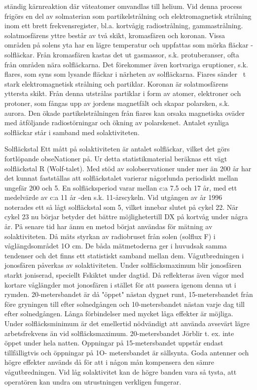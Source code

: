 \documentclass[a4paper,twoside,twocolumn,openright]{book}
\begin{document}
{{{{{ständig kärnreaktion där väteatomer omvandlas till helium. Vid denna process frigörs en del av solmaterian som partikelstrålning och elektromagnetisk strålning inom ett
brett frekvensregister, bl.a. kortvågig radiostrålning, gammastrålning. solatmosfärens
yttre består av två skikt, kromasfären och
koronan. Vissa områden på solens yta har
en lägre temperatur och uppfattas som mörka fläckar - solfläckar. Från kromasfären
kastas det ut gasmassor, s.k. protuberanser, ofta från områden nära solfläckarna.
Det förekommer även kortvariga eruptioner, s.k. flares, som syns som lysande fläckar i närheten av solfläckarna. Fiares sänder
~t stark elektromagnetisk strålning och partiklar. Koronan är solatmosfärens yttersta
skikt. Från denna utstrålas partiklar i form av
atomer, elektroner och protoner, som fångas upp av jordens magnetfält och skapar
polarsken, s.k. aurora. Den ökade partikelstrålningen från fiares kan orsaka magnetiska oväder med åtföljande radiostörningar
och ökning av polarskenet. Antalet synliga
solfläckar står i samband med solaktiviteten.

Solfläckstal
Ett mått på solaktiviteten är antalet solfläckar, vilket det görs fortlöpande obseNationer på. Ur detta statistikmaterial beräknas
ett vägt solfläckstal R (Wolf-talet). Med stöd
av solobservationer under mer än 200 år har
det kunnat fastställas att solfläckstalet varierar någorlunda periodiskt mellan ungefär
200 och 5.
En solfläcksperiod varar mellan c:a 7.5
och 17 år, med ett medelvärde av c:a 11 år
-den s.k. 11-årscykeln. Vid utgången av år
1996 noterades ett så lågt solfläckstal som
5, vilket innebar slutet på cykel 22.
När cykel 23 nu börjar betyder det bättre
möjlighetertill DX på kortvåg under några år.
På senare tid har ännu en metod börjat
användas för mätning av solaktiviteten. Då
mäts styrkan av radiobruset från solen (solflux F) i våglängdsområdet 1O cm.
De båda mätmetoderna ger i huvudsak
samma tendenser och det finns ett statistiskt
samband mellan dem.
Vågutbredningen i jonosfären påverkas
av solaktiviteten. Under solfläcksmaximum
blir jonosfären starkt joniserad, speciellt Fskiktet under dagtid. Då reflekteras även
vågor med kortare våglängder mot jonosfären i stället för att passera igenom denna ut
i rymden. 20-metersbandet är då "öppet"
nästan dygnet runt, 15-metersbandet från
före gryningen till efter solnedgången och
10-metersbandet nästan varje dag till efter
solnedgången. Långa förbindelser med
mycket låga effekter är möjliga.
Under solfläcksminimum är det emellertid nödvändigt att använda avsevärt lägre
arbetsfrekvens än vid solfläcksmaximum.
20-metersbandet Jörblir t. ex. inte öppet under hela natten. Oppningar på 15-metersbandet uppstår endast tillfälligtvis och öppningar på 1O- metersbandet är sällsynta.
Goda antenner och högre effekter används
då för att i någon mån kompensera den
sämre vågutbredningen. Vid låg solaktivitet
kan de högre banden vara så tysta, att operatören kan undra om utrustningen verkligen
fungerar.

}}}}}
\end{document}
